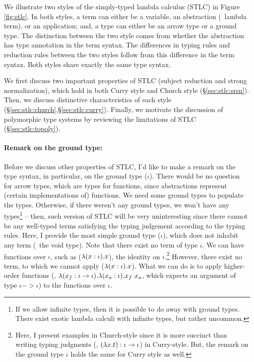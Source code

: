 We illustrate two styles of the simply-typed lambda calculus (STLC)
in Figure \ref{fig:stlc}. In both styles, a term can either be a variable,
an abstraction (\aka\ lambda term), or an application; and, a type can
either be an arrow type or a ground type. The distinction between
the two style comes from whether the abstraction has type annotation
in the term syntax. The differences in typing rules and reduction rules
between the two styles follow from this difference in the term syntax.
Both styles share exactly the same type syntax.

We first discuss two important properties of STLC
(subject reduction and strong normalization), which hold
in both Curry style and Church style (\S\ref{sec:stlc:srsn}).
Then, we discuss distinctive characteristics of each style
(\S\ref{sec:stlc:church},\S\ref{sec:stlc:curry}).
Finally, we motivate the discussion of polymorphic type systems
by reviewing the limitations of STLC (\S\ref{sec:stlc:topoly}).

\paragraph{Remark on the ground type:}
Before we discuss other properties of STLC, I'd like to make a remark on
the type syntax, in particular, on the ground type ($\iota$).
There would be no question for arrow types, which are types for functions,
since abstractions represent (certain implementations of) functions.
We need some ground types to populate the types. Otherwise, if there weren't
any ground types, we won't have any types\footnote{If we allow infinite
types, then it is possible to do away with ground types. There exist
exotic lambda calculi with infinite types, but rather uncommon.}
-- then, such version of STLC will be very uninteresting since there cannot
be any well-typed terms satisfying the typing judgement according to
the typing rules. Here, I provide the most simple ground type ($\iota$),
which does not inhabit any term (\aka\ the void type). Note that there
exist no term of type $\iota$. We can have functions over $\iota$,
such as ($\lambda(x:\iota).x$), the identity on $\iota$.\footnote{Here,
	I present examples in Church-style since it is more succinct than
	writing typing judgments (\eg, $(\lambda x.t) : \iota -> \iota$)
	in Curry-style.  But, the remark on the ground type $\iota$
	holds the same for Curry style as well.}
However, there exist no term, to which we cannot apply ($\lambda(x:\iota).x$).
What we can do is to apply higher-order functions
(\eg, $\lambda(x_{f}:\iota -> \iota).\lambda(x_a:\iota).x_f~x_a$, which expects
an argument of type $\iota -> \iota$) to the functions over $\iota$.

